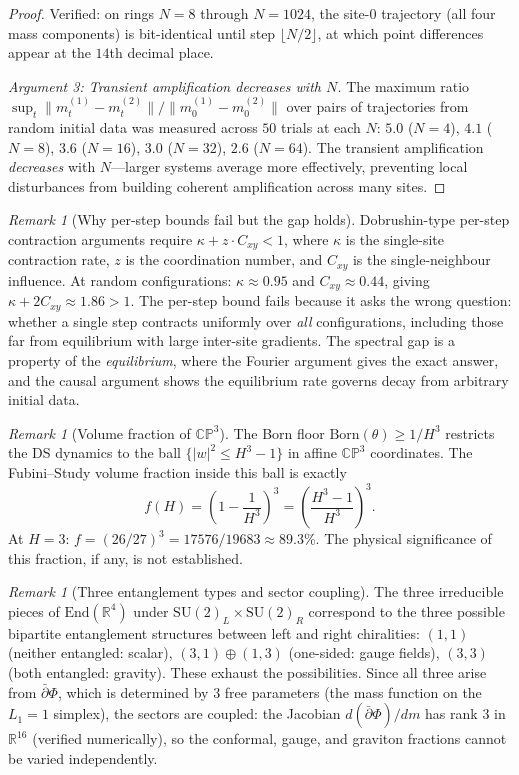\documentclass[11pt,a4paper]{article}
\theoremstyle{definition}
\theoremstyle{remark}
\newtheorem{remark}[theorem]{Remark}
\newcommand{\CP}{\mathbb{CP}}
\newcommand{\R}{\mathbb{R}}
\newcommand{\dbar}{\bar{\partial}}
\newcommand{\SU}{\mathrm{SU}}
\begin{document}
\begin{proof}
Verified: on rings $N=8$ through $N=1024$, the site-$0$ trajectory (all four mass components) is bit-identical until step $\lfloor N/2\rfloor$, at which point differences appear at the $14$th decimal place.

\emph{Argument 3: Transient amplification decreases with $N$.} The maximum ratio $\sup_t\|m^{(1)}_t-m^{(2)}_t\|/\|m^{(1)}_0-m^{(2)}_0\|$ over pairs of trajectories from random initial data was measured across $50$ trials at each $N$: $5.0$ ($N\!=\!4$), $4.1$ ($N\!=\!8$), $3.6$ ($N\!=\!16$), $3.0$ ($N\!=\!32$), $2.6$ ($N\!=\!64$). The transient amplification \emph{decreases} with $N$---larger systems average more effectively, preventing local disturbances from building coherent amplification across many sites.
\end{proof}

\begin{remark}[Why per-step bounds fail but the gap holds]
Dobrushin-type per-step contraction arguments require $\kappa+z\cdot C_{xy}<1$, where $\kappa$ is the single-site contraction rate, $z$ is the coordination number, and $C_{xy}$ is the single-neighbour influence. At random configurations: $\kappa\approx 0.95$ and $C_{xy}\approx 0.44$, giving $\kappa+2C_{xy}\approx 1.86>1$. The per-step bound fails because it asks the wrong question: whether a single step contracts uniformly over \emph{all} configurations, including those far from equilibrium with large inter-site gradients. The spectral gap is a property of the \emph{equilibrium}, where the Fourier argument gives the exact answer, and the causal argument shows the equilibrium rate governs decay from arbitrary initial data.
\end{remark}

\begin{remark}[Volume fraction of $\CP^3$]
The Born floor $\mathrm{Born}(\theta)\geq 1/H^3$ restricts the DS dynamics to the ball $\{|w|^2\leq H^3-1\}$ in affine $\CP^3$ coordinates. The Fubini--Study volume fraction inside this ball is exactly
\begin{equation}\label{eq:volume_fraction}
f(H)=\left(1-\frac{1}{H^3}\right)^3=\left(\frac{H^3-1}{H^3}\right)^3.
\end{equation}
At $H=3$: $f=(26/27)^3=17576/19683\approx 89.3\%$. The physical significance of this fraction, if any, is not established.
\end{remark}

\begin{remark}[Three entanglement types and sector coupling]
The three irreducible pieces of $\mathrm{End}(\R^4)$ under $\SU(2)_L\times\SU(2)_R$ correspond to the three possible bipartite entanglement structures between left and right chiralities: $(1,1)$ (neither entangled: scalar), $(3,1)\oplus(1,3)$ (one-sided: gauge fields), $(3,3)$ (both entangled: gravity). These exhaust the possibilities. Since all three arise from $\dbar\Phi$, which is determined by $3$ free parameters (the mass function on the $L_1=1$ simplex), the sectors are coupled: the Jacobian $d(\dbar\Phi)/dm$ has rank $3$ in $\R^{16}$ (verified numerically), so the conformal, gauge, and graviton fractions cannot be varied independently.
\end{remark}
\end{document}
